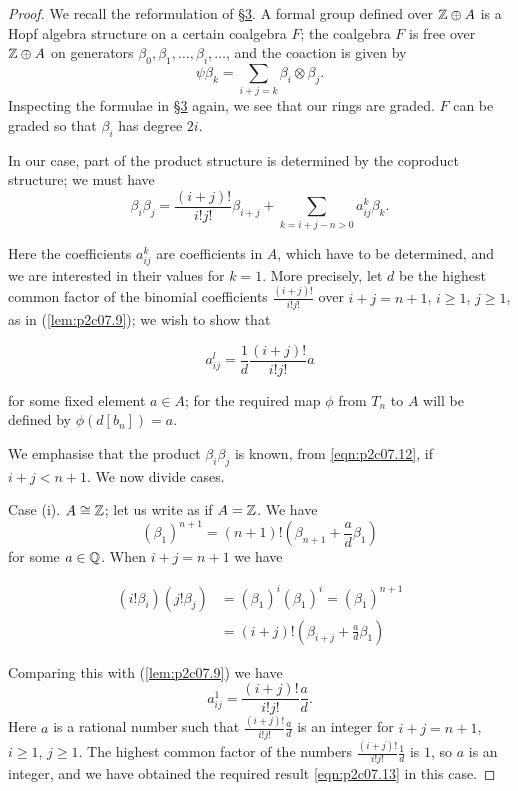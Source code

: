 \documentclass[../main]{subfiles}
\begin{document}
\begin{proof}
We recall the reformulation of \hyperref[sec:p2c3]{\S 3}. A formal group defined over $\mathbb{Z} \oplus A$ is a Hopf algebra structure on a certain coalgebra $F$; the coalgebra $F$ is free over $\mathbb{Z} \oplus A$ on generators $\beta_0, \beta_1, \ldots, \beta_i, \ldots$, and the coaction is given by $$\psi \beta_k = \sum_{i + j = k} \beta_i \otimes \beta_j.$$ Inspecting the formulae in \hyperref[sec:p2c3]{\S 3} again, we see that our rings are graded. $F$ can be graded so that $\beta_i$ has degree $2i$. 

In our case, part of the product structure is determined by the coproduct structure; we must have
\begin{equation}
\tag{7.12}
\label{eqn:p2c07.12}
\beta_i \beta_j = \frac {(i + j)!} {i! j!} \beta_{i + j} + \sum_{k = i + j - n > 0} a_{ij}^k \beta_k.
\end{equation}

Here the coefficients $a_{ij}^k$ are coefficients in $A$, which have to be determined, and we are interested in their values for $k = 1$. More precisely, let $d$ be the highest common factor of the binomial coefficients $\tfrac {(i + j)!} {i! j!}$ over $i + j = n + 1$, $i \ge 1$, $j \ge 1$, as in (\ref{lem:p2c07.9}); we wish to show that 

\begin{equation}
\tag{7.13}
\label{eqn:p2c07.13}
a_{ij}^l = \frac 1 d \frac {(i + j)!} {i! j!} a
\end{equation}

for some fixed element $a \in A$; for the required map $\phi$ from $T_n$ to $A$ will be defined by $\phi(d[b_n]) = a$. 

We emphasise that the product $\beta_i \beta_j$ is known, from \eqref{eqn:p2c07.12}, if $i + j < n + 1$. We now divide cases.

Case (i). $A \cong \mathbb{Z}$; let us write as if $A = \mathbb{Z}$. We have $$(\beta_1)^{n + 1} = (n + 1)! \left(\beta_{n + 1} + \frac a d \beta_1\right)$$ for some $a \in \mathbb{Q}$. When $i + j = n + 1$ we have 

\begin{align*}
(i! \beta_i) (j! \beta_j) & = (\beta_1)^i (\beta_1)^i = (\beta_1)^{n + 1} \\ & = (i + j)! \left(\beta_{i + j} + \frac a d \beta_1\right)
\end{align*}

Comparing this with (\ref{lem:p2c07.9}) we have $$a_{ij}^1 = \frac {(i + j)!} {i! j!} \frac a d.$$ Here $a$ is a rational number such that $\displaystyle \frac {(i + j)!} {i! j!} \frac a d$ is an integer for $i + j = n + 1$, $i \ge 1$, $j \ge 1$. The highest common factor of the numbers $\displaystyle \frac {(i + j)!} {i! j!} \frac 1 d$ is $1$, so $a$ is an integer, and we have obtained the required result \eqref{eqn:p2c07.13} in this case.


\end{proof}
\end{document}
